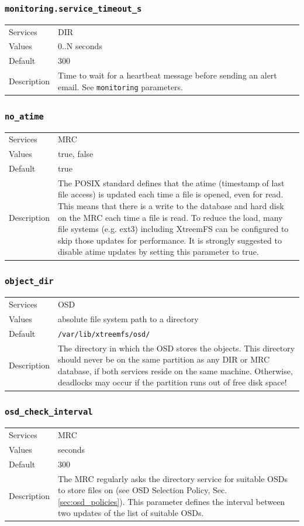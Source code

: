 \documentclass[a4paper,10pt]{book}
\begin{document}
\subsubsection{\texttt{monitoring.service\_timeout\_s}}
\begin{tabular}{lp{10cm}}
 Services & DIR\\
 Values   & 0..N seconds \\
 Default  & 300 \\
 Description & Time to wait for a heartbeat message before sending an alert email. See \texttt{monitoring} parameters.
\end{tabular}

\subsubsection{\texttt{no\_atime}}
\begin{tabular}{lp{10cm}}
 Services & MRC\\
 Values   & true, false \\
 Default  & true\\
 Description & The POSIX standard defines that the atime (timestamp of last file access) is updated each time a file is opened, even for read. This means that there is a write to the database and hard disk on the MRC each time a file is read. To reduce the load, many file systems (e.g. ext3) including XtreemFS can be configured to skip those updates for performance. It is strongly suggested to disable atime updates by setting this parameter to true.
\end{tabular}

\subsubsection{\texttt{object\_dir}}
\begin{tabular}{lp{10cm}}
 Services & OSD\\
 Values   & absolute file system path to a directory\\
 Default  & \texttt{/var/lib/xtreemfs/osd/}\\
 Description & The directory in which the OSD stores the objects. This directory should never be on the same partition as any DIR or MRC database, if both services reside on the same machine. Otherwise, deadlocks may occur if the partition runs out of free disk space!
\end{tabular}

\subsubsection{\texttt{osd\_check\_interval}}
\begin{tabular}{lp{10cm}}
 Services & MRC\\
 Values   & seconds \\
 Default  & 300\\
 Description & The MRC regularly asks the directory service for suitable OSDs to store files on (see OSD Selection Policy, Sec. \ref{sec:osd_policies}). This parameter defines the interval between two updates of the list of suitable OSDs.
\end{tabular}
\end{document}
